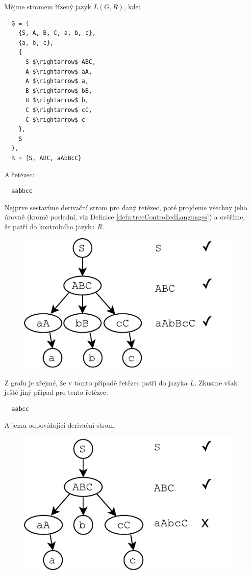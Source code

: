 \begin{exmp}
  \label{exmp:abc}
  Mějme stromem řízený jazyk $L(G, R)$, kde:
  \begin{lstlisting}
  G = (
    {S, A, B, C, a, b, c},
    {a, b, c},
    {
      S $\rightarrow$ ABC,
      A $\rightarrow$ aA,
      A $\rightarrow$ a,
      B $\rightarrow$ bB,
      B $\rightarrow$ b,
      C $\rightarrow$ cC,
      C $\rightarrow$ c
    },
    S
  ),
  R = {S, ABC, aAbBcC}
  \end{lstlisting}
  \noindent
  A řetězec:

  \begin{lstlisting}
  aabbcc
  \end{lstlisting}

  \noindent
  Nejprve sestavíme derivační strom pro daný řetězec, poté projdeme všechny
  jeho úrovně (kromě poslední, viz Definice \ref{defn:treeControlledLanguages}) a
  ověříme, že patří do kontrolního jazyka $R$.

  \begin{figure}[H]
    \centering
    \includegraphics{fig/TreeControlledGrammar1.pdf}
  \end{figure}

  \noindent
  Z grafu je zřejmé, že v tomto případě řetězec patří do jazyka $L$.
  Zkusme však ještě jiný případ pro tento řetězec:

  \begin{lstlisting}
  aabcc
  \end{lstlisting}

  \noindent
  A jemu odpovídající derivační strom:
  \begin{figure}[H]
    \centering
    \includegraphics{fig/TreeControlledGrammar2.pdf}
  \end{figure}


\end{exmp}
